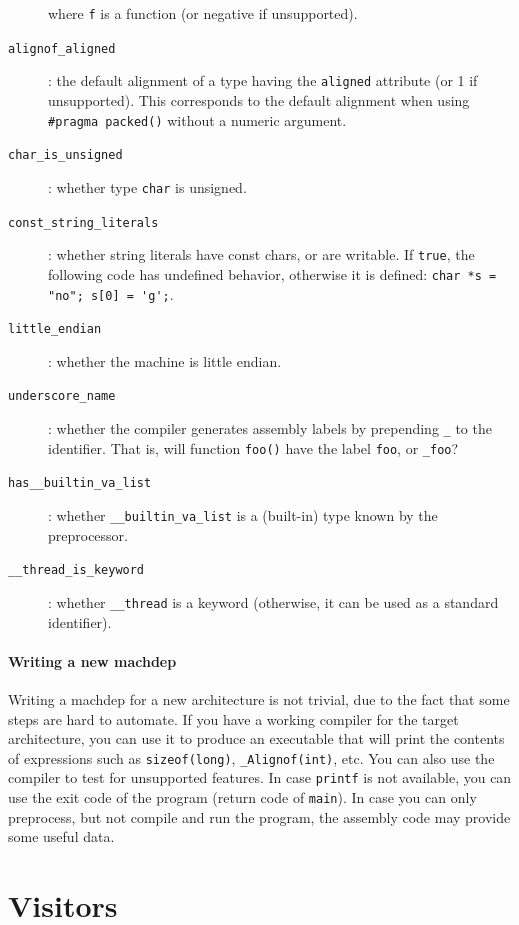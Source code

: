 \begin{description}
    where \verb+f+ is a function (or negative if unsupported).
  \item[\texttt{alignof\_aligned}]: the default alignment of a type having the
    \verb+aligned+ attribute (or 1 if unsupported). This corresponds to the
    default alignment when using \verb+#pragma packed()+ without a numeric
    argument.
  \item[\texttt{char\_is\_unsigned}]: whether type \verb+char+ is unsigned.
  \item[\texttt{const\_string\_literals}]: whether string literals have const
    chars, or are writable. If \verb+true+, the following code has undefined
    behavior, otherwise it is defined: \verb+char *s = "no"; s[0] = 'g';+.
  \item[\texttt{little\_endian}]: whether the machine is little endian.
  \item[\texttt{underscore\_name}]: whether the compiler generates assembly
    labels by prepending \verb+_+ to the identifier. That is, will function
    \verb+foo()+ have the label \verb+foo+, or \verb+_foo+?
  \item[\texttt{has\_\_builtin\_va\_list}]: whether \verb+__builtin_va_list+
    is a (built-in) type known by the preprocessor.
  \item[\texttt{\_\_thread\_is\_keyword}]: whether \verb+__thread+ is a
    keyword (otherwise, it can be used as a standard identifier).
\end{description}

\paragraph{Writing a new machdep}

Writing a machdep for a new architecture is not trivial, due to the fact
that some steps are hard to automate. If you have a working compiler for the
target architecture, you can use it to produce an executable that will print
the contents of expressions such as \verb+sizeof(long)+, \verb+_Alignof(int)+,
etc. You can also use the compiler to test for unsupported features.
In case \verb+printf+ is not available, you can use the exit code of the
program (return code of \verb+main+). In case you can only preprocess, but not
compile and run the program, the assembly code may provide some useful data.


\section{Visitors}\label{adv:visitors}

